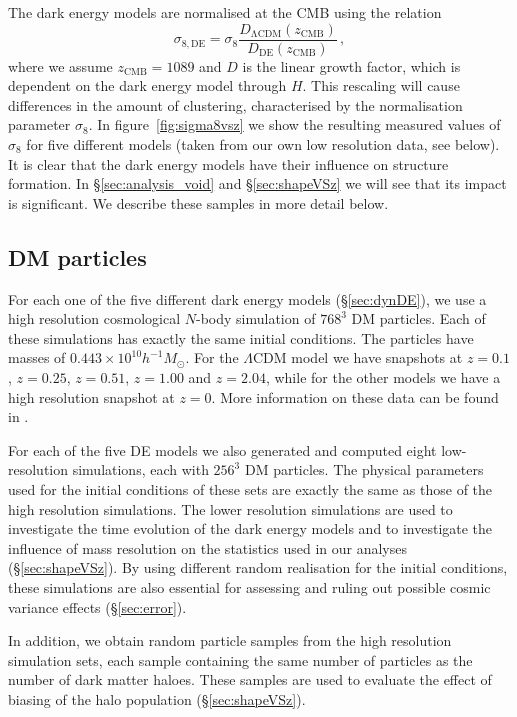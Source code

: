 The dark energy models are normalised at the CMB using the relation
\begin{equation}
\label{eqn:sigma8norm}
\sigma_{8,\mathrm{DE}} = \sigma_8 \frac{D_\mathrm{{\Lambda}CDM}(z_\mathrm{CMB})}{D_\mathrm{DE}(z_\mathrm{CMB})} \,,
\end{equation}
where we assume $z_\mathrm{CMB} = 1089$ and $D$ is the linear growth factor, which is dependent on the dark energy model through $H$. This rescaling 
will cause differences in the amount of clustering, characterised by the normalisation parameter $\sigma_8$. In figure~\ref{fig:sigma8vsz} we 
show the resulting measured values of $\sigma_8$ for five different models (taken from our own low resolution data, see below). It is clear 
that the dark energy models have their influence on structure formation. In \S\ref{sec:analysis_void} and \S\ref{sec:shapeVSz} 
we will see that its impact is significant. We describe these samples in more detail below.

\subsection{DM particles}
\label{sec:dm_particles}
For each one of the five different dark energy models (\S\ref{sec:dynDE}), we use a high resolution cosmological $N$-body simulation 
of $768^3$ DM particles. Each of these simulations has exactly the same initial conditions. The particles have masses of $0.443 \times 10^{10} h^{-1} M_\odot$. 
For the $\Lambda$CDM model we have snapshots at $z = 0.1$, $z=0.25$, $z=0.51$, $z=1.00$ and $z=2.04$, while for the other models we have a 
high resolution snapshot at $z=0$. More information on these data can be found in \citet{deboni11}.

For each of the five DE models we also generated and computed eight low-resolution simulations, each with $256^3$ DM particles. 
The physical parameters used for the initial conditions of these sets are exactly the same as those of the high resolution 
simulations. The lower resolution simulations are used to investigate the time evolution of the dark energy models and to investigate the 
influence of mass resolution on the statistics used in our analyses (\S\ref{sec:shapeVSz}). By using different random realisation for 
the initial conditions, these simulations are also essential for assessing and ruling out possible cosmic variance effects (\S\ref{sec:error}).

In addition, we obtain random particle samples from the high resolution simulation sets, each sample containing the same 
number of particles as the number of dark matter haloes. These samples are used to evaluate the effect of biasing of 
the halo population (\S\ref{sec:shapeVSz}).

